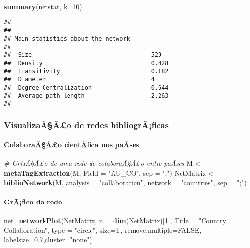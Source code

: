 \documentclass[]{article}
\newenvironment{Shaded}{\begin{snugshade}}{\end{snugshade}}
\newcommand{\KeywordTok}[1]{\textcolor[rgb]{0.13,0.29,0.53}{\textbf{#1}}}
\newcommand{\DataTypeTok}[1]{\textcolor[rgb]{0.13,0.29,0.53}{#1}}
\newcommand{\DecValTok}[1]{\textcolor[rgb]{0.00,0.00,0.81}{#1}}
\newcommand{\FloatTok}[1]{\textcolor[rgb]{0.00,0.00,0.81}{#1}}
\newcommand{\StringTok}[1]{\textcolor[rgb]{0.31,0.60,0.02}{#1}}
\newcommand{\CommentTok}[1]{\textcolor[rgb]{0.56,0.35,0.01}{\textit{#1}}}
\newcommand{\OtherTok}[1]{\textcolor[rgb]{0.56,0.35,0.01}{#1}}
\newcommand{\NormalTok}[1]{#1}
\let\oldparagraph\paragraph
\renewcommand{\paragraph}[1]{\oldparagraph{#1}\mbox{}}
\begin{document}
\begin{Shaded}
\begin{Highlighting}[]
\KeywordTok{summary}\NormalTok{(netstat, }\DataTypeTok{k=}\DecValTok{10}\NormalTok{)}
\end{Highlighting}
\end{Shaded}

\begin{verbatim}
## 
## 
## Main statistics about the network
## 
##  Size                                  529 
##  Density                               0.028 
##  Transitivity                          0.182 
##  Diameter                              4 
##  Degree Centralization                 0.644 
##  Average path length                   2.263 
## 
\end{verbatim}

\subsubsection{VisualizaÃ§Ã£o de redes
bibliogrÃ¡ficas}\label{visualizaaao-de-redes-bibliograficas}

\paragraph{ColaboraÃ§Ã£o cientÃ­fica nos
paÃ­ses}\label{colaboraaao-cientafica-nos-paases}

\begin{Shaded}
\begin{Highlighting}[]
\CommentTok{# CriaÃ§Ã£o de uma rede de colaboraÃ§Ã£o entre paÃ­ses}
\NormalTok{M <-}\StringTok{ }\KeywordTok{metaTagExtraction}\NormalTok{(M, }\DataTypeTok{Field =} \StringTok{"AU_CO"}\NormalTok{, }\DataTypeTok{sep =} \StringTok{";"}\NormalTok{)}
\NormalTok{NetMatrix <-}\StringTok{ }\KeywordTok{biblioNetwork}\NormalTok{(M, }\DataTypeTok{analysis =} \StringTok{"collaboration"}\NormalTok{, }
                           \DataTypeTok{network =} \StringTok{"countries"}\NormalTok{, }\DataTypeTok{sep =} \StringTok{";"}\NormalTok{)}
\end{Highlighting}
\end{Shaded}

\paragraph{GrÃ¡fico da rede}\label{grafico-da-rede}

\begin{Shaded}
\begin{Highlighting}[]
\NormalTok{net=}\KeywordTok{networkPlot}\NormalTok{(NetMatrix, }\DataTypeTok{n =} \KeywordTok{dim}\NormalTok{(NetMatrix)[}\DecValTok{1}\NormalTok{], }\DataTypeTok{Title =} \StringTok{"Country Collaboration"}\NormalTok{, }
                \DataTypeTok{type =} \StringTok{"circle"}\NormalTok{, }\DataTypeTok{size=}\NormalTok{T, }\DataTypeTok{remove.multiple=}\OtherTok{FALSE}\NormalTok{, }
                \DataTypeTok{labelsize=}\FloatTok{0.7}\NormalTok{,}\DataTypeTok{cluster=}\StringTok{"none"}\NormalTok{)}
\end{Highlighting}
\end{Shaded}
\end{document}
